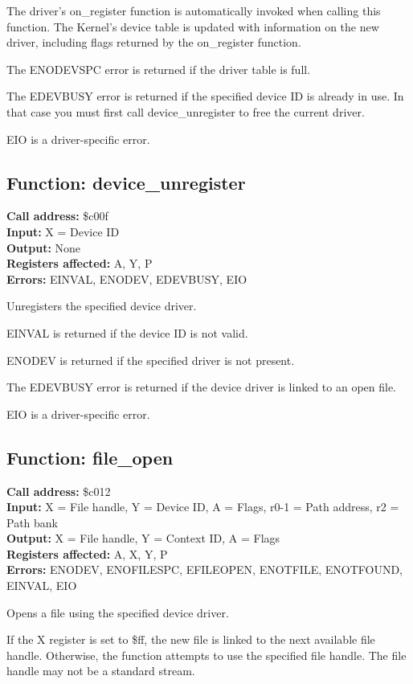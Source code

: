 The driver's on\_register function is automatically invoked when calling this function. 
The Kernel's device table is updated with information on the new driver, 
including flags returned by the on\_register function.

The ENODEVSPC error is returned if the driver table is full.

The EDEVBUSY error is returned if the specified device ID is already in use.
In that case you must first call device\_unregister to free the current driver.

EIO is a driver-specific error.


\subsection{Function: device\_unregister}

\textbf{Call address:} \$c00f \\
\textbf{Input:} X = Device ID \\
\textbf{Output:} None \\
\textbf{Registers affected:} A, Y, P \\
\textbf{Errors:} EINVAL, ENODEV, EDEVBUSY, EIO

Unregisters the specified device driver.

EINVAL is returned if the device ID is not valid.

ENODEV is returned if the specified driver is not present.

The EDEVBUSY error is returned if the device driver is linked to an open file.

EIO is a driver-specific error.


\subsection{Function: file\_open}

\textbf{Call address:} \$c012\\
\textbf{Input:} X = File handle, Y = Device ID, A = Flags, r0-1 = Path address, r2 = Path bank \\
\textbf{Output:} X = File handle, Y = Context ID, A = Flags \\
\textbf{Registers affected:} A, X, Y, P \\
\textbf{Errors:} ENODEV, ENOFILESPC, EFILEOPEN, ENOTFILE, ENOTFOUND, EINVAL, EIO

Opens a file using the specified device driver.

If the X register is set to \$ff, the new file is linked to the next available file handle. 
Otherwise, the function attempts to use the specified file handle. The file handle may not be
a standard stream.

